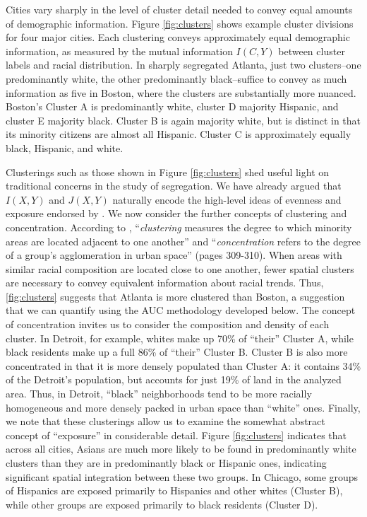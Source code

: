 	Cities vary sharply in the level of cluster detail needed to convey equal amounts of demographic information. Figure \ref{fig:clusters} shows example cluster divisions for four major cities. Each clustering conveys approximately equal demographic information, as measured by the mutual information $I(C,Y)$ between cluster labels and racial distribution. In sharply segregated Atlanta, just two clusters--one predominantly white, the other predominantly black--suffice to convey as much information as five in Boston, where the clusters are substantially more nuanced. Boston's Cluster A is predominantly white, cluster D majority Hispanic, and cluster E majority black. Cluster B is again majority white, but is distinct in that its minority citizens are almost all Hispanic. Cluster C is approximately equally black, Hispanic, and white. 

	Clusterings such as those shown in Figure \ref{fig:clusters} shed useful light on traditional concerns in the study of segregation. We have already argued that $I(X,Y)$ and $J(X,Y)$ naturally encode the high-level ideas of evenness and exposure endorsed by \cite{Reardon2004}. We now consider the further concepts of clustering and concentration. According to \cite{Press2009a}, ``\emph{clustering} measures the degree to which minority areas are located adjacent to one another'' and ``\emph{concentration} refers to the degree of a group's agglomeration in urban space'' (pages 309-310). When areas with similar racial composition are located close to one another, fewer spatial clusters are necessary to convey equivalent information about racial trends. Thus, \ref{fig:clusters} suggests that Atlanta is more clustered than Boston, a suggestion that we can quantify using the AUC methodology developed below. The concept of concentration invites us to consider the composition and density of each cluster. In Detroit, for example, whites make up 70\% of ``their'' Cluster A, while black residents make up a full 86\% of ``their'' Cluster B. Cluster B is also more concentrated in that it is more densely populated than Cluster A: it contains 34\% of the Detroit's population, but accounts for just 19\% of land in the analyzed area. Thus, in Detroit, ``black'' neighborhoods tend to be more racially homogeneous and more densely packed in urban space than ``white'' ones. Finally, we note that these clusterings allow us to examine the somewhat abstract concept of ``exposure'' in considerable detail. Figure \ref{fig:clusters} indicates that across all cities, Asians are much more likely to be found in predominantly white clusters than they are in predominantly black or Hispanic ones, indicating significant spatial integration between these two groups. In Chicago, some groups of Hispanics are exposed primarily to Hispanics and other whites (Cluster B), while other groups are exposed primarily to black residents (Cluster D).

